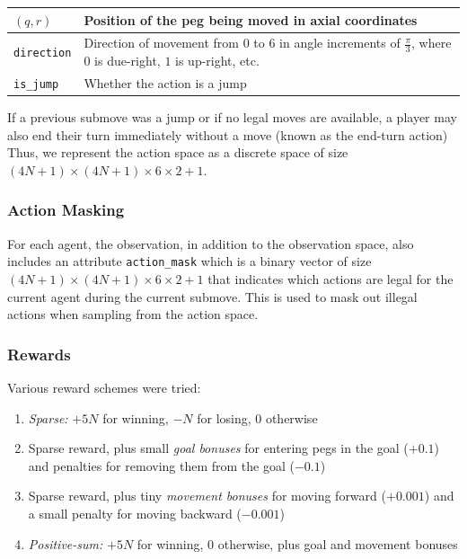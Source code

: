 \documentclass[12pt, a4paper, twocolumn]{article}
\begin{document}
\begin{center}
  \begin{tabular}{|m{}|m{}|}
    \hline
    $(q, r)$ & Position of the peg being moved in axial coordinates \\
    \hline
    \texttt{direction} & Direction of movement from $0$ to $6$ in angle increments of $\frac{\pi}{3}$, where $0$ is due-right, $1$ is up-right, etc. \\
    \hline
    \texttt{is\_jump} & Whether the action is a jump \\
    \hline
  \end{tabular}
  \end{center}

  If a previous submove was a jump or if no legal moves are available, a player may also end their turn immediately without a move (known as the end-turn action)  Thus, we represent the action space as a discrete space of size $(4N + 1) \times (4N + 1) \times 6 \times 2 + 1$.

\subsubsection{Action Masking}

For each agent, the observation, in addition to the observation space, also includes an attribute \texttt{action\_mask} which is a binary vector of size $(4N + 1) \times (4N + 1) \times 6 \times 2 + 1$ that indicates which actions are legal for the current agent during the current submove. This is used to mask out illegal actions when sampling from the action space.

\subsubsection{Rewards}

Various reward schemes were tried:

\begin{enumerate}
  \item \textit{Sparse:} $+5N$ for winning, $-N$ for losing, $0$ otherwise
  \item Sparse reward, plus small \textit{goal bonuses} for entering pegs in the goal ($+0.1$) and penalties for removing them from the goal ($-0.1$)
  \item Sparse reward, plus tiny \textit{movement bonuses} for moving forward ($+0.001$) and a small penalty for moving backward ($-0.001$)
  \item \textit{Positive-sum:} $+5N$ for winning, $0$ otherwise, plus goal and movement bonuses
\end{enumerate}
\end{document}
